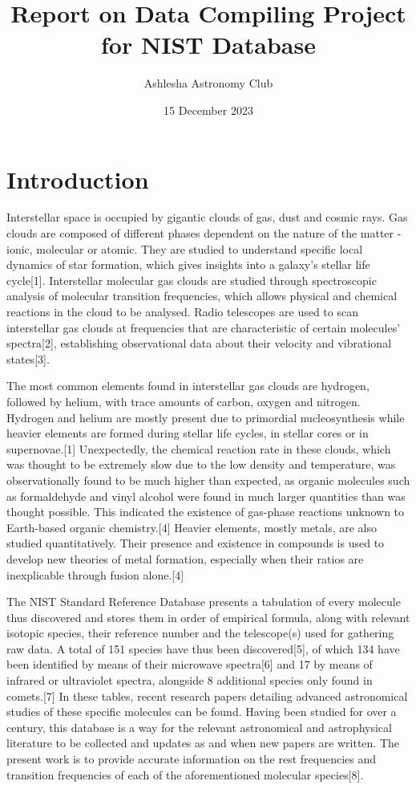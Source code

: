 \documentclass{article}
\title{Report on Data Compiling Project for NIST Database}
\author{Ashlesha Astronomy Club}
\date{15 December 2023}
\begin{document}
\maketitle

\section{Introduction}
\par
\indent 
Interstellar space is occupied by gigantic clouds of gas, dust and cosmic rays. Gas clouds are composed of different phases dependent on the nature of the matter - ionic, molecular or atomic. They are studied to understand specific local dynamics of star formation, which gives insights into a galaxy's stellar life cycle[1]. Interstellar molecular gas clouds are studied through spectroscopic analysis of molecular transition frequencies, which allows physical and chemical reactions in the cloud to be analysed. Radio telescopes are used to scan interstellar gas clouds at frequencies that are characteristic of certain molecules' spectra[2], establishing observational data about their velocity and vibrational states[3].

\par
The most common elements found in interstellar gas clouds are hydrogen, followed by helium, with trace amounts of carbon, oxygen and nitrogen. Hydrogen and helium are mostly present due to primordial nucleosynthesis while heavier elements are formed during stellar life cycles, in stellar cores or in supernovae.[1] Unexpectedly, the chemical reaction rate in these clouds, which was thought to be extremely slow due to the low density and temperature, was observationally found to be much higher than expected, as organic molecules such as formaldehyde and vinyl alcohol were found in much larger quantities than was thought possible. This indicated the existence of gas-phase reactions unknown to Earth-based organic chemistry.[4] Heavier elements, mostly metals, are also studied quantitatively. Their presence and existence in compounds is used to develop new theories of metal formation, especially when their ratios are inexplicable through fusion alone.[4]

\par
The NIST Standard Reference Database presents a tabulation of every molecule thus discovered and stores them in order of empirical formula, along with relevant isotopic species, their reference number and the telescope(s) used for gathering raw data. A total of 151 species have thus been discovered[5], of which 134 have been identified by means of their microwave spectra[6] and 17 by means of infrared or ultraviolet spectra, alongside 8 additional species only found in comets.[7] In these tables, recent research papers detailing advanced astronomical studies of these specific molecules can be found. Having been studied for over a century, this database is a way for the relevant astronomical and astrophysical literature to be collected and updates as and when new papers are written. The present work is to provide accurate information on the rest frequencies and transition frequencies of each of the aforementioned molecular species[8].
\end{document}
